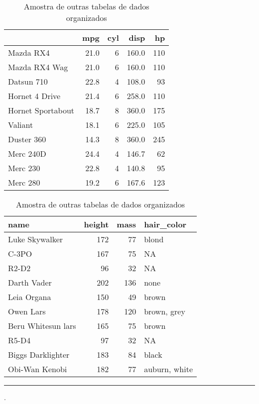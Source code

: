\documentclass[11pt,]{style/krantz}
\makeatletter
\newenvironment{Shaded}{\begin{snugshade}}{\end{snugshade}}
\newcommand{\NormalTok}[1]{#1}
\newenvironment{kframe}{%
\medskip{}
\setlength{\fboxsep}{.8em}
 \def\at@end@of@kframe{}%
 \ifinner\ifhmode%
  \def\at@end@of@kframe{\end{minipage}}%
  \begin{minipage}{\columnwidth}%
 \fi\fi%
 \def\FrameCommand##1{\hskip\@totalleftmargin \hskip-\fboxsep
 \colorbox{shadecolor}{##1}\hskip-\fboxsep
     \hskip-\linewidth \hskip-\@totalleftmargin \hskip\columnwidth}%
 \MakeFramed {\advance\hsize-\width
   \@totalleftmargin\z@ \linewidth\hsize
   \@setminipage}}%
 {\par\unskip\endMakeFramed%
 \at@end@of@kframe}
\renewenvironment{Shaded}{\begin{kframe}}{\end{kframe}}
\theoremstyle{definition}
\theoremstyle{definition}
\theoremstyle{definition}
\theoremstyle{remark}
\makeatother
\begin{document}
\begin{table}[!h]
\caption{\label{tab:tab02}Amostra de outras tabelas de dados organizados}

\centering
\begin{tabular}{lrrrr}
\toprule
  & mpg & cyl & disp & hp\\
\midrule
Mazda RX4 & 21.0 & 6 & 160.0 & 110\\
Mazda RX4 Wag & 21.0 & 6 & 160.0 & 110\\
Datsun 710 & 22.8 & 4 & 108.0 & 93\\
Hornet 4 Drive & 21.4 & 6 & 258.0 & 110\\
Hornet Sportabout & 18.7 & 8 & 360.0 & 175\\
\addlinespace
Valiant & 18.1 & 6 & 225.0 & 105\\
Duster 360 & 14.3 & 8 & 360.0 & 245\\
Merc 240D & 24.4 & 4 & 146.7 & 62\\
Merc 230 & 22.8 & 4 & 140.8 & 95\\
Merc 280 & 19.2 & 6 & 167.6 & 123\\
\bottomrule
\end{tabular}
\centering
\begin{tabular}{lrrl}
\toprule
name & height & mass & hair\_color\\
\midrule
Luke Skywalker & 172 & 77 & blond\\
C-3PO & 167 & 75 & NA\\
R2-D2 & 96 & 32 & NA\\
Darth Vader & 202 & 136 & none\\
Leia Organa & 150 & 49 & brown\\
\addlinespace
Owen Lars & 178 & 120 & brown, grey\\
Beru Whitesun lars & 165 & 75 & brown\\
R5-D4 & 97 & 32 & NA\\
Biggs Darklighter & 183 & 84 & black\\
Obi-Wan Kenobi & 182 & 77 & auburn, white\\
\bottomrule
\end{tabular}
\end{table}

\pagebreak

\begin{center}\rule{0.5\linewidth}{\linethickness}\end{center}

\begin{Shaded}
\begin{Highlighting}[]
\NormalTok{.}
\end{Highlighting}
\end{Shaded}
\end{document}
